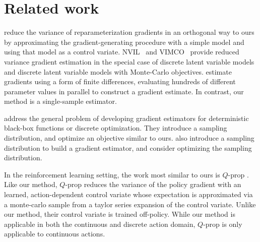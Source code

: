 \documentclass{article}
\begin{document}
\section{Related work}
\citet{miller2017reducing} reduce the variance of reparameterization gradients in an orthogonal way to ours by approximating the gradient-generating procedure with a simple model and using that model as a control variate.
NVIL~\citep{mnih2014neural} and VIMCO~\citep{mnih2016variational} provide reduced variance gradient estimation in the special case of discrete latent variable models and discrete latent variable models with Monte-Carlo objectives.
\citet{salimans2017evolution} estimate gradients using a form of finite differences, evaluating hundreds of different parameter values in parallel to construct a gradient estimate.
In contrast, our method is a single-sample estimator.



\citet{staines2012variational} address the general problem of developing gradient estimators for deterministic black-box functions or discrete optimization.
They introduce a sampling distribution, and optimize an objective similar to ours.
\citet{wierstra2014natural} also introduce a sampling distribution to build a gradient estimator, and consider optimizing the sampling distribution.

In the reinforcement learning setting, the work most similar to ours is $Q$-prop \citep{haarnoja2017reinforcement}.
Like our method, $Q$-prop reduces the variance of the policy gradient with an learned, action-dependent control variate whose expectation is approximated via a monte-carlo sample from a taylor series expansion of the control variate.
Unlike our method, their control variate is trained off-policy.
While our method is applicable in both the continuous and discrete action domain, $Q$-prop is only applicable to continuous actions.

\end{document}
